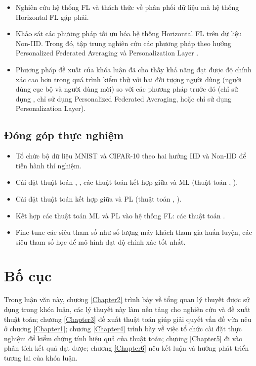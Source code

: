 \begin{itemize}
    \item Nghiên cứu hệ thống FL và thách thức về phân phối dữ liệu mà hệ thống Horizontal FL gặp phải.
    \item Khảo sát các phương pháp tối ưu hóa hệ thống Horizontal FL trên dữ liệu Non-IID. Trong đó, tập trung nghiên cứu các phương pháp theo hướng Personalized Federated Averaging \parencite{fallah2020personalized, chen2018federated} và Personalization Layer \parencite{liang2020think, arivazhagan2019federated}.
    \item Phương pháp đề xuất của khóa luận đã cho thấy khả năng đạt được độ chính xác cao hơn trong quá trình kiểm thử với hai đối tượng người dùng (người dùng cục bộ và người dùng mới) so với các phương pháp trước đó (chỉ sử dụng , chỉ sử dụng Personalized Federated Averaging, hoặc chỉ sử dụng Personalization Layer).
\end{itemize}

\subsection{Đóng góp thực nghiệm}

\begin{itemize}
    \item Tổ chức bộ dữ liệu MNIST và CIFAR-10 theo hai hướng IID và Non-IID để tiến hành thí nghiệm.
    \item Cài đặt thuật toán , , các thuật toán kết hợp giữa  và ML (thuật toán , ).
    \item Cài đặt thuật toán kết hợp giữa  và PL (thuật toán , ).
    \item Kết hợp các thuật toán ML và PL vào hệ thống FL: các thuật toán .
    \item Fine-tune các siêu tham số như số lượng máy khách tham gia huấn luyện, các siêu tham số học để mô hình đạt độ chính xác tốt nhất.
\end{itemize}

\section{Bố cục}

Trong luận văn này, chương \ref{Chapter2} trình bày về tổng quan lý thuyết được sử dụng trong khóa luận, các lý thuyết này làm nền tảng cho nghiên cứu và đề xuất thuật toán; chương \ref{Chapter3} đề xuất thuật toán giúp giải quyết vấn đề vừa nêu ở chương \ref{Chapter1}; chương \ref{Chapter4} trình bày về việc tổ chức cài đặt thực nghiệm để kiểm chứng tính hiệu quả của thuật toán; chương \ref{Chapter5} đi vào phân tích kết quả đạt được; chương \ref{Chapter6} nêu kết luận và hướng phát triển tương lai của khóa luận.
